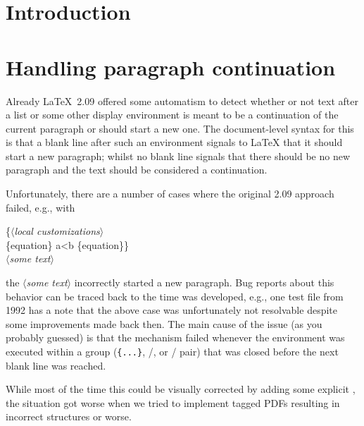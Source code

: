\documentclass{ltnews}
\providecommand\meta[1]{$\langle$\textrm{\itshape#1}$\rangle$}
\begin{document}
\maketitle
{  \spaceskip=3.33pt 
\tableofcontents}

\setlength{}

\medskip

\section{Introduction}


\section{Handling paragraph continuation}

Already \LaTeX~2.09 offered some automatism to detect whether or not
text after a list or some other display environment is meant to be a
continuation of the current paragraph or should start a new one.  The
document-level syntax for this is that a blank line after such an
environment signals to \LaTeX{} that it should start a new paragraph; whilst
no blank line signals that there should be no new paragraph and the
text should be considered a continuation.

Unfortunately, there are a number of cases where the original 2.09
approach failed, e.g., with
\begin{flushleft}
  \ttfamily
\{\meta{local customizations}\\
\{equation\} a<b \{equation\}\} \\
\meta{some text}
\end{flushleft}
the \meta{some text} incorrectly started a new paragraph.  Bug reports
about this behavior can be traced back to the time \LaTeXe{} was
developed, e.g., one test file from 1992 has a note that the above
case was unfortunately not resolvable despite some improvements made back
then.  The main cause of the issue (as you probably guessed) is that
the mechanism failed whenever the environment was executed within a
group (\texttt{\{...\}}, /, or
/ pair) that was closed before the next blank
line was reached.

While most of the time  this could be visually corrected by adding some
explicit , the situation got worse when we tried to
implement tagged PDFs resulting in incorrect structures or worse.
\end{document}
